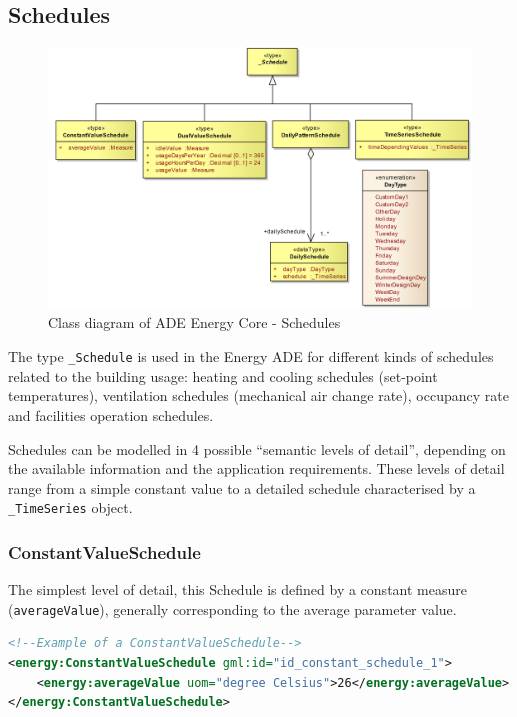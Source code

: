 \documentclass[a4paper,12pt]{article}
\begin{document}
\subsection{Schedules}\label{schedules}

\begin{figure}[htbp]
\centering
\includegraphics{fig/class_schedules.png}
\caption{Class diagram of ADE Energy Core - Schedules}
\end{figure}

The type \lstinline!_Schedule! is used in the Energy ADE for different
kinds of schedules related to the building usage: heating and cooling
schedules (set-point temperatures), ventilation schedules (mechanical
air change rate), occupancy rate and facilities operation schedules.

Schedules can be modelled in 4 possible ``semantic levels of detail'',
depending on the available information and the application requirements.
These levels of detail range from a simple constant value to a detailed
schedule characterised by a \lstinline!_TimeSeries! object.

\subsubsection{ConstantValueSchedule}\label{constantvalueschedule}

The simplest level of detail, this Schedule is defined by a constant
measure (\lstinline!averageValue!), generally corresponding to the
average parameter value.

\begin{lstlisting}[language=XML]
<!--Example of a ConstantValueSchedule-->
<energy:ConstantValueSchedule gml:id="id_constant_schedule_1">
    <energy:averageValue uom="degree Celsius">26</energy:averageValue>
</energy:ConstantValueSchedule>
\end{lstlisting}
\end{document}
